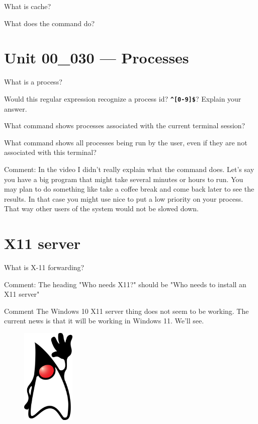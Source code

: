 \documentclass[letterpaper,12pt]{exam}
\newcommand{\unit}{Unit 00}
\begin{document}
\begin{questions}
\begin {samepage}
\end{samepage}
\begin{samepage}
\question What is cache?  
\vspace{5mm}
\end{samepage}

\question What does the  command do?

\section*{\unit\_030 --- Processes}

\question What is a process?
\vspace{10mm}

\question Would this regular expression recognize a process id?  \texttt{\textbf{\textquotesingle\^{}[0-9]\$\textquotesingle}}?  Explain your answer.
\vspace{10mm}

\question What command shows processes associated with the current terminal session?
\vspace{5mm}

\question What command shows all processes being run by the user, even if they are not associated with this terminal?
\vspace{5mm}

\noindent Comment:  In the video I didn't really explain what the  command does.  Let's say you have a big program that might take several minutes or hours to run.  You may plan to do something like take a coffee break and come back later to see the results.  In that case you might use nice to put a low priority on your process.  That way other users of the system would not be slowed down.

\section*{X11 server}

\begin{samepage}
\question What is X-11 forwarding? 
\vspace{5mm}
\end{samepage}
\noindent Comment:  The heading "Who needs X11?" should be "Who needs to install an X11 server"

\noindent Comment The Windows 10 X11 server thing does not seem to be working.  The current news is that it will be working in Windows 11.  We'll see.

\end{questions}
\noindent 

\begin{figure}[b]\label{end}
	\center
	\includegraphics[width=1in]{../duke.png}
\end{figure}
\end{document}
